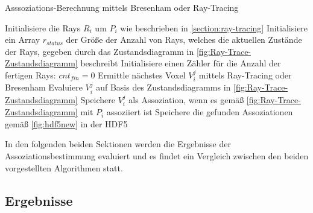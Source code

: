 \begin{algorithm}[H]
\caption{Asssoziations-Berechnung mittels Bresenham oder Ray-Tracing} \label{pseudo:associations}
\begin{algorithmic}[1]
	\State Initialisiere die Rays $R_i$ um $P_{i}$ wie beschrieben in \ref{section:ray-tracing}
	\State Initialisiere ein Array $r_{status}$ der Größe der Anzahl von Rays, welches die aktuellen 				Zustände der Rays, gegeben durch das Zustandsdiagramm in \ref{fig:Ray-Trace-Zustandsdiagramm} beschreibt
	\State Initialisiere einen Zähler für die Anzahl der fertigen Rays: $cnt_{fin} = 0$
			\State Ermittle nächstes Voxel $V_i^j$ mittels Ray-Tracing oder Bresenham
			\State Evaluiere $V_i^j$ auf Basis des Zustandsdiagramms in \ref{fig:Ray-Trace-Zustandsdiagramm}
			\State Speichere $V_i^j$ als Assoziation, wenn es gemäß \ref{fig:Ray-Trace-Zustandsdiagramm} mit $P_i$ assoziiert ist
		\EndFor \label{Rays-Loop}
	\EndWhile
	\State Speichere die gefunden Assoziationen gemäß \ref{fig:hdf5new} in der HDF5
\EndProcedure
\end{algorithmic}
\end{algorithm}

In den folgenden beiden Sektionen werden die Ergebnisse der Assoziationsbestimmung evaluiert und es findet ein Vergleich zwischen den beiden vorgestellten Algorithmen statt.

\subsection{Ergebnisse}
\label{section:association_results}

